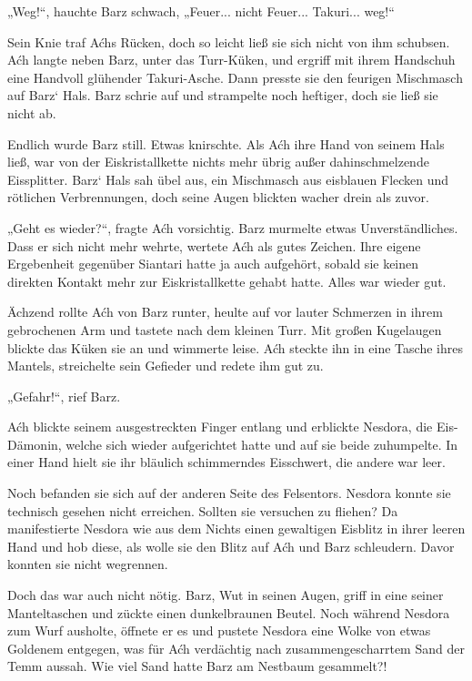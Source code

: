 „Weg!“, hauchte Barz schwach, „Feuer... nicht Feuer... Takuri... weg!“

Sein Knie traf Aćhs Rücken, doch so leicht ließ sie sich nicht von ihm schubsen. Aćh langte neben Barz, unter das Turr-Küken, und ergriff mit ihrem Handschuh eine Handvoll glühender Takuri-Asche. Dann presste sie den feurigen Mischmasch auf Barz‘ Hals. Barz schrie auf und strampelte noch heftiger, doch sie ließ sie nicht ab.

Endlich wurde Barz still. Etwas knirschte. Als Aćh ihre Hand von seinem Hals ließ, war von der Eiskristallkette nichts mehr übrig außer dahinschmelzende Eissplitter. Barz‘ Hals sah übel aus, ein Mischmasch aus eisblauen Flecken und rötlichen Verbrennungen, doch seine Augen blickten wacher drein als zuvor.

„Geht es wieder?“, fragte Aćh vorsichtig. Barz murmelte etwas Unverständliches. Dass er sich nicht mehr wehrte, wertete Aćh als gutes Zeichen. Ihre eigene Ergebenheit gegenüber Siantari hatte ja auch aufgehört, sobald sie keinen direkten Kontakt mehr zur Eiskristallkette gehabt hatte. Alles war wieder gut.

Ächzend rollte Aćh von Barz runter, heulte auf vor lauter Schmerzen in ihrem gebrochenen Arm und tastete nach dem kleinen Turr. Mit großen Kugelaugen blickte das Küken sie an und wimmerte leise. Aćh steckte ihn in eine Tasche ihres Mantels, streichelte sein Gefieder und redete ihm gut zu.

„Gefahr!“, rief Barz.

Aćh blickte seinem ausgestreckten Finger entlang und erblickte Nesdora, die Eis-Dämonin, welche sich wieder aufgerichtet hatte und auf sie beide zuhumpelte. In einer Hand hielt sie ihr bläulich schimmerndes Eisschwert, die andere war leer.

Noch befanden sie sich auf der anderen Seite des Felsentors. Nesdora konnte sie technisch gesehen nicht erreichen. Sollten sie versuchen zu fliehen? Da manifestierte Nesdora wie aus dem Nichts einen gewaltigen Eisblitz in ihrer leeren Hand und hob diese, als wolle sie den Blitz auf Aćh und Barz schleudern. Davor konnten sie nicht wegrennen.

Doch das war auch nicht nötig. Barz, Wut in seinen Augen, griff in eine seiner Manteltaschen und zückte einen dunkelbraunen Beutel. Noch während Nesdora zum Wurf ausholte, öffnete er es und pustete Nesdora eine Wolke von etwas Goldenem entgegen, was für Aćh verdächtig nach zusammengescharrtem Sand der Temm aussah. Wie viel Sand hatte Barz am Nestbaum gesammelt?!

